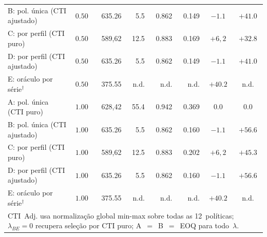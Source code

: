 \begin{table}[H]
\begin{tabular}{@{}p{3.4cm}crrrrcc@{}}
B: pol. única (CTI ajustado) & $0.50$ & 635.26 & 5.5 & 0.862 & 0.149 & $-1.1$ & $+41.0$ \\
C: por perfil (CTI puro) & $0.50$ & 589,62 & 12.5 & 0.883 & 0.169 & $+6,2$ & $+32.8$ \\
D: por perfil (CTI ajustado) & $0.50$ & 635.26 & 5.5 & 0.862 & 0.149 & $-1.1$ & $+41.0$ \\
E: oráculo por série$^\dagger$ & $0.50$ & 375.55 & n.d. & n.d. & n.d. & $+40.2$ & n.d. \\
\midrule
A: pol. única (CTI puro) & $1.00$ & 628,42 & 55.4 & 0.942 & 0.369 & $0.0$ & $0.0$ \\
B: pol. única (CTI ajustado) & $1.00$ & 635.26 & 5.5 & 0.862 & 0.160 & $-1.1$ & $+56.6$ \\
C: por perfil (CTI puro) & $1.00$ & 589,62 & 12.5 & 0.883 & 0.202 & $+6,2$ & $+45.3$ \\
D: por perfil (CTI ajustado) & $1.00$ & 635.26 & 5.5 & 0.862 & 0.160 & $-1.1$ & $+56.6$ \\
E: oráculo por série$^\dagger$ & $1.00$ & 375.55 & n.d. & n.d. & n.d. & $+40.2$ & n.d. \\
\bottomrule
\multicolumn{8}{l}{\scriptsize CTI~Adj. usa normalização global min-max sobre todas as 12~políticas; $\lambda_{BE}=0$ recupera seleção por CTI puro; A~$=$~B~$=$~EOQ para todo~$\lambda$.} \\
\end{tabular}
\end{table}

